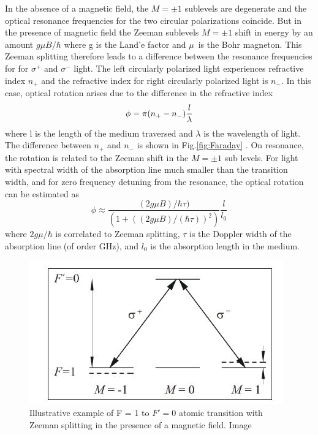  In the absence of a magnetic field, the $M=\pm 1$ sublevels are
degenerate and the optical resonance frequencies for  the two circular
polarizations coincide. But in the presence of magnetic field the Zeeman sublevels $M=\pm 1$ shift in energy  by an amount $g\mu B/\hbar$ where g is the Land'e factor and $\mu$~is the Bohr magneton. This Zeeman splitting therefore leads to a difference between the  resonance frequencies for for $\sigma^+$ and
$\sigma^-$ light. The left circularly polarized light experiences refractive index $n_+$ and the refractive index for right circularly polarized light is $n_-$. In this case, optical rotation arises due to the difference in the refractive index   \cite{bib:NMOR1998}
\begin{equation}
\label{eq:emc}
\phi = \pi(n_+-n_{-})\frac{l}{\lambda} \\
\end{equation}
where l is the length of the medium traversed and $\lambda$ is the wavelength of light. The difference between $n_+$ and $n_-$ is shown in  Fig.\ref{fig:Faraday} . On resonance, the rotation is related to the Zeeman shift in the $M=\pm 1$ sub levels. For light with spectral
width of the absorption line much smaller than the transition width, and for zero
frequency detuning from the resonance, the optical rotation can be estimated as \cite{bib:NMOR1998}
\begin{equation}
\phi \approx \frac{(2g\mu B)/ \hbar\tau)}{(1+((2g\mu B)/(\hbar\tau))^2 )}\frac{l}{l_0}
\end{equation}
where $2g\mu/\hbar$ is correlated to Zeeman splitting, $\tau$ is the Doppler width of the
absorption line (of order GHz), and $l_0$ is the absorption length in the medium. 
\begin{figure}[h]
\centering
\includegraphics[width=0.75\linewidth]{figures/optical_rotation}
\caption{Illustrative example of F = 1 to $F' = 0$ atomic transition with Zeeman
splitting in the presence of a magnetic field. Image\cite{bib:Budker2002}\label{fig:Zeemansplitting}}
\end{figure}
